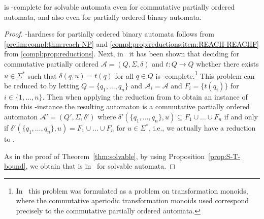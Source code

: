 \begin{theorem} \label{prelim:compl:thm:reachf-NP}
	\REACHF is \NP-complete for solvable automata even for commutative partially ordered automata,
	and also even for partially ordered binary automata.
\end{theorem}
\begin{proof}
	\NP-hardness for partially ordered binary automata
	follows from \cref{prelim:compl:thm:reach-NP}
	and \cref{compl:prop:reductions:item:REACH-REACHF} from \cref{compl:prop:reductions}.
	Next, in~\cite[Thm.~9]{DBLP:journals/iandc/Beaudry88}
	it has been shown that deciding
	for commutative partially ordered $\mathcal A = (Q, \Sigma, \delta)$
	and $t \colon Q \to Q$
	whether there exists $u \in \Sigma^*$
	such that $\delta(q, u) = t(q)$
	for all $q \in Q$ is \NP-complete.\footnote{In~\cite{DBLP:journals/iandc/Beaudry88} this problem was formulated as a problem on transformation monoids, where the 
		commutative aperiodic transformation monoids used
		correspond precisely to the commutative partially ordered automata.}
	This problem can be reduced to \DFAINT 
	by letting $Q = \{q_1, \ldots, q_n\}$ and $\mathcal A_i = \mathcal A$
	and $F_i = \{t(q_i)\}$ for $ i \in \{1,\ldots,n\}$.
	Then when applying the reduction
	from 
	 to obtain an instance of \ST 
	from this \DFAINT-instance
    the resulting automaton is a commutative partially ordered automaton 
	$\mathcal A' = (Q', \Sigma, \delta')$
	where $\delta'(\{q_1, \ldots, q_n\}, u) \subseteq F_1 \cup \ldots \cup F_n$
	if and only if $\delta'(\{q_1, \ldots, q_n\}, u) = F_1 \cup \ldots \cup F_n$ for $u \in \Sigma^*$, i.e., we actually have a reduction to \REACHF.
	
	As in the proof of Theorem~\ref{thm:solvable},
	by using Proposition~\ref{prop:S-T-bound},
	we obtain that \REACHF is in \NP\ 
	for solvable automata.
\end{proof}